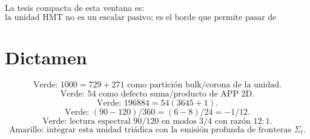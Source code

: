 \documentclass[11pt,a4paper]{article}
\begin{document}
La tesis compacta de esta ventana es:
\[
\boxed{\text{la unidad HMT no es un escalar pasivo; es el borde que permite pasar de acumulaci\'on a pliegue.}}
\]

\section*{Dictamen}
\[
\boxed{\text{Verde: }1000=729+271\text{ como partici\'on bulk/corona de la unidad.}}
\]
\[
\boxed{\text{Verde: }54\text{ como defecto suma/producto de APP 2D.}}
\]
\[
\boxed{\text{Verde: }196884=54(3645+1).}
\]
\[
\boxed{\text{Verde: }(90-120)/360=(6-8)/24=-1/12.}
\]
\[
\boxed{\text{Verde: lectura espectral 90/120 en modos 3/4 con raz\'on }12:1.}
\]
\[
\boxed{\text{Amarillo: integrar esta unidad tri\'adica con la emisi\'on profunda de fronteras }\Sigma_t.}
\]
\end{document}
